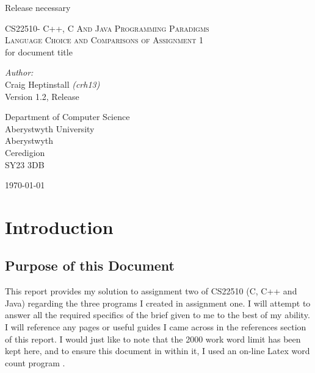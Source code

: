 \documentclass[a4paper]{article}
\begin{document}
\pagestyle{fancy}
Release
necessary
\begin{center}
\textsc{\LARGE CS22510-  C++, C And Java Programming Paradigms }\\
\vspace{10 mm}
\textsc{\LARGE Language Choice and Comparisons of Assignment 1}\\[0.5cm] %
for document title

\vspace{60 mm}
\begin{minipage}{0.8\textwidth}
\begin{flushleft} \large
\emph{Author:}\\
Craig Heptinstall \emph{(crh13)}\\
\vspace{10 mm}
Version 1.2, Release
\end{flushleft}
\end{minipage}
\vspace{80 mm}

\begin{minipage}{0.8\textwidth}
\begin{flushleft} \large
Department of Computer Science\\
Aberystwyth University\\
Aberystwyth\\
Ceredigion\\
SY23 3DB\\
\end{flushleft}
\end{minipage}
\vfill
{\large \today}
\end{center}
\clearpage
\setlength\parindent{0pt}


\tableofcontents
\clearpage

\section{Introduction}
\subsection{Purpose of this Document}
This report provides my solution to assignment two of CS22510 (C, C++ and Java)
regarding the three programs I created in assignment one. I will attempt to
answer all the required specifics of the brief \cite{brief} given to me to the
best of my ability.
I will reference any pages or useful guides I came across in the references
section of this report. I would just like to note that the 2000 work word limit
has been kept here, and to ensure this document in within it, I used an on-line
Latex word count program \cite{words}.
\end{document}
